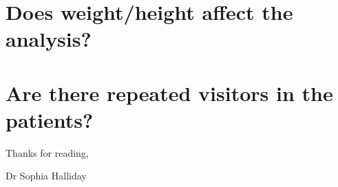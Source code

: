 \documentclass[
]{article}
\begin{document}
\hypertarget{does-weightheight-affect-the-analysis}{%
\section{Does weight/height affect the
analysis?}\label{does-weightheight-affect-the-analysis}}

\hypertarget{are-there-repeated-visitors-in-the-patients}{%
\section{Are there repeated visitors in the
patients?}\label{are-there-repeated-visitors-in-the-patients}}

Thanks for reading,

Dr Sophia Halliday
\end{document}
